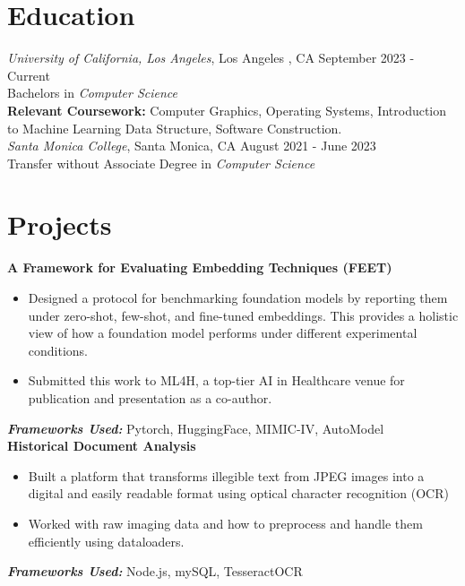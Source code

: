 \documentclass[a4paper,10pt]{article}
\begin{document}
\section*{Education}
\textit{University of California, Los Angeles}, Los Angeles , CA \hspace*{\fill} September 2023 - Current \\
Bachelors in \textit{Computer Science}\\
\textbf{Relevant Coursework:} Computer Graphics, Operating Systems, Introduction to Machine Learning Data Structure, Software Construction.
\\

\noindent\textit{Santa Monica College}, Santa Monica, CA \hspace*{\fill} August 2021 - June 2023 \\
Transfer without Associate Degree in \textit{Computer Science} \\ 

\section*{Projects}

\textbf{A Framework for Evaluating Embedding Techniques (FEET)} 
\href{https://github.com/Simonlee711/FEET}{\faGithub} 
\href{https://drive.google.com/file/d/1DEEyCGNTNiPLP5uQpIZ-lwrw1W03NUzs/view?usp=sharing}{\faNewspaper} \\
\begin{itemize}
    \item Designed a protocol for benchmarking foundation models by reporting them under zero-shot, few-shot, and fine-tuned embeddings. This provides a holistic view of how a foundation model performs under different experimental conditions.
    \item Submitted this work to ML4H, a top-tier AI in Healthcare venue for publication and presentation as a co-author.
\end{itemize}

\hspace{-5mm}\textbf{\textit{Frameworks Used:}} Pytorch, HuggingFace, MIMIC-IV, AutoModel \\


\noindent\textbf{Historical Document Analysis} \href{https://github.com/tmdgjs2592/Text-Renewal}{\faGithub }
\begin{itemize}
    \item Built a platform that transforms illegible text from JPEG images into a digital and easily readable format using optical character recognition (OCR)
    \item Worked with raw imaging data and how to preprocess and handle them efficiently using dataloaders.
    
\end{itemize}
\textbf{\textit{Frameworks Used:} }Node.js, mySQL, TesseractOCR \\
\end{document}
